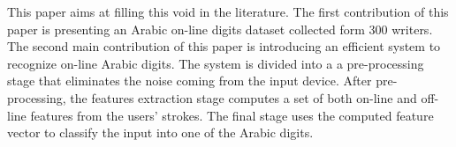 \documentclass[times, 10pt,twocolumn]{article}
\begin{document}




This paper aims at filling this void in the literature. The first contribution of this paper is presenting an Arabic on-line digits dataset collected form 300 writers. The second main contribution of this paper is introducing an efficient system to recognize on-line Arabic digits. The system is divided into a a pre-processing stage that eliminates the noise coming from the input device. After pre-processing, the features extraction stage computes a set of both on-line and off-line features from the users' strokes. The final stage uses the computed feature vector to classify the input into one of the Arabic digits. %
\end{document}

